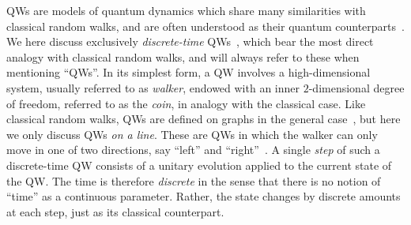 %  

\acp{QW} are models of quantum dynamics which share many similarities with classical random walks, and are often understood as their quantum counterparts~\cite{aharonov2000quantum,kempe2003quantum,venegasandraca2012quantum,portugal2013quantum}.
We here discuss exclusively \emph{discrete-time} \acp{QW}~\cite{chandrashekar2008optimizing}, which bear the most direct analogy with classical random walks, and will always refer to these when mentioning ``QWs''.
In its simplest form, a \ac{QW} involves a high-dimensional system, usually referred to as \emph{walker}, endowed with an inner $2$-dimensional degree of freedom, referred to as the \emph{coin}, in analogy with the classical case.
Like classical random walks, QWs are defined on graphs in the general case~\cite{aharonov2000quantum}, but here we only discuss QWs \emph{on a line}. These are QWs in which the walker can only move in one of two directions, say ``left'' and ``right''~\cite{ambainis2001onedimensional}.
A single \textit{step} of such a discrete-time \ac{QW} consists of a unitary evolution applied to the current state of the \ac{QW}. The time is therefore \emph{discrete} in the sense that there is no notion of ``time'' as a continuous parameter. Rather, the state changes by discrete amounts at each step, just as its classical counterpart.

